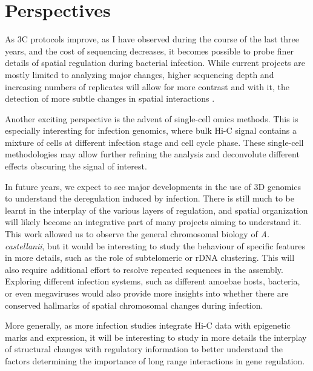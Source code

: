 
\chapter{Perspectives} %

\label{ch:03-03} %

As 3C protocols improve, as I have observed during the course of the last three years, and the cost of sequencing decreases, it becomes possible to probe finer details of spatial regulation during bacterial infection. While current projects are mostly limited to analyzing major changes, higher sequencing depth and increasing numbers of replicates will allow for more contrast and with it, the detection of more subtle changes in spatial interactions \cite{mullerCharacterizingMeioticChromosomes2018}.

Another exciting perspective is the advent of single-cell omics methods. This is especially interesting for infection genomics, where bulk Hi-C signal contains a mixture of cells at different infection stage and cell cycle phase. These single-cell methodologies may allow further refining the analysis and deconvolute different effects obscuring the signal of interest.

In future years, we expect to see major developments in the use of 3D genomics to understand the deregulation induced by infection. There is still much to be learnt in the interplay of the various layers of regulation, and spatial organization will likely become an integrative part of many projects aiming to understand it. This work allowed us to observe the general chromosomal biology of \textit{A. castellanii}, but it would be interesting to study the behaviour of specific features in more details, such as the role of subtelomeric or rDNA clustering. This will also require additional effort to resolve repeated sequences in the assembly. Exploring different infection systems, such as different amoebae hosts, bacteria, or even megaviruses would also provide more insights into whether there are conserved hallmarks of spatial chromosomal changes during infection.

More generally, as more infection studies integrate Hi-C data with epigenetic marks and expression, it will be interesting to study in more details the interplay of structural changes with regulatory information to better understand the factors determining the importance of long range interactions in gene regulation.

